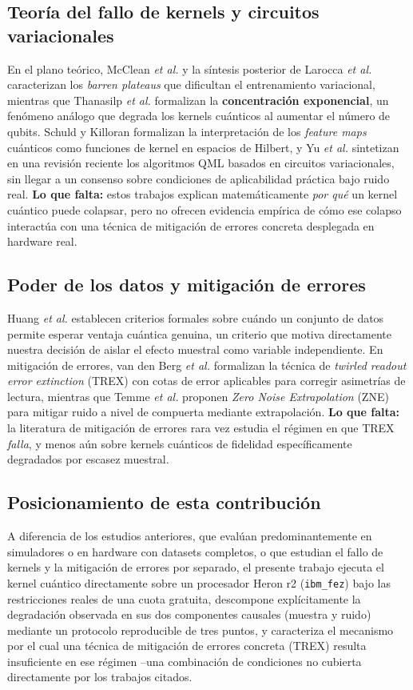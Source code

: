 \documentclass[conference]{IEEEtran}
\begin{document}
\subsection{Teoría del fallo de kernels y circuitos variacionales}
En el plano teórico, McClean \textit{et al.} \cite{mcclean2018} y la síntesis posterior de Larocca \textit{et al.} \cite{larocca2025} caracterizan los \textit{barren plateaus} que dificultan el entrenamiento variacional, mientras que Thanasilp \textit{et al.} \cite{thanasilp2024} formalizan la \textbf{concentración exponencial}, un fenómeno análogo que degrada los kernels cuánticos al aumentar el número de qubits. Schuld y Killoran \cite{schuld2019} formalizan la interpretación de los \textit{feature maps} cuánticos como funciones de kernel en espacios de Hilbert, y Yu \textit{et al.} \cite{yu2025} sintetizan en una revisión reciente los algoritmos QML basados en circuitos variacionales, sin llegar a un consenso sobre condiciones de aplicabilidad práctica bajo ruido real. \textbf{Lo que falta:} estos trabajos explican matemáticamente \emph{por qué} un kernel cuántico puede colapsar, pero no ofrecen evidencia empírica de cómo ese colapso interactúa con una técnica de mitigación de errores concreta desplegada en hardware real.

\subsection{Poder de los datos y mitigación de errores}
Huang \textit{et al.} \cite{huang2021} establecen criterios formales sobre cuándo un conjunto de datos permite esperar ventaja cuántica genuina, un criterio que motiva directamente nuestra decisión de aislar el efecto muestral como variable independiente. En mitigación de errores, van den Berg \textit{et al.} \cite{vandenberg2022} formalizan la técnica de \textit{twirled readout error extinction} (TREX) con cotas de error aplicables para corregir asimetrías de lectura, mientras que Temme \textit{et al.} \cite{temme2017} proponen \textit{Zero Noise Extrapolation} (ZNE) para mitigar ruido a nivel de compuerta mediante extrapolación. \textbf{Lo que falta:} la literatura de mitigación de errores rara vez estudia el régimen en que TREX \emph{falla}, y menos aún sobre kernels cuánticos de fidelidad específicamente degradados por escasez muestral.

\subsection{Posicionamiento de esta contribución}
A diferencia de los estudios anteriores, que evalúan predominantemente en simuladores o en hardware con datasets completos, o que estudian el fallo de kernels y la mitigación de errores por separado, el presente trabajo ejecuta el kernel cuántico directamente sobre un procesador Heron r2 (\texttt{ibm\_fez}) bajo las restricciones reales de una cuota gratuita, descompone explícitamente la degradación observada en sus dos componentes causales (muestra y ruido) mediante un protocolo reproducible de tres puntos, y caracteriza el mecanismo por el cual una técnica de mitigación de errores concreta (TREX) resulta insuficiente en ese régimen --una combinación de condiciones no cubierta directamente por los trabajos citados.
\end{document}
